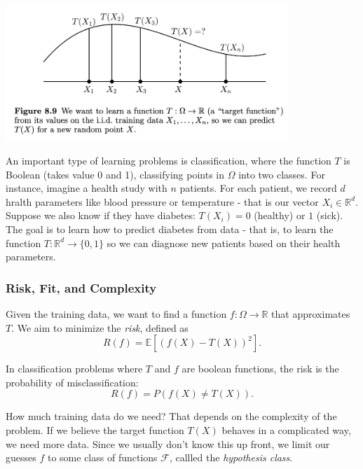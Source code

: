 \begin{center}
	\includegraphics[width=0.8\textwidth]{Chapter 8/fig8-9.png}
\end{center}

\begin{example}[Classification]
\label{ex:8.4.1}
An important type of learning problems is classification, where the function $T$ is Boolean (takes value 0 and 
1), classifying points in $\Omega$ into two classes. For instance, imagine a health study with $n$ patients. 
For each patient, we record $d$ hralth parameters like blood pressure or temperature - that is our vector 
$X_i \in \mathbb{R}^d$. Suppose we also know if they have diabetes: $T(X_i) = 0$ (healthy) or $1$ (sick). The 
goal is to learn how to predict diabetes from data - that is, to learn the function $T: \mathbb{R}^d \to 
\{ 0, 1 \}$ so we can diagnose new patients based on their health parameters.
\end{example}


\subsubsection{Risk, Fit, and Complexity}
Given the training data, we want to find a function $f: \Omega \to \mathbb{R}$ that approximates $T$. 
We aim to minimize the \textit{risk}, defined as
\[ R(f) = \mathbb{E}\left[ (f(X) - T(X))^2 \right]. \]

\begin{example}[]
\label{ex:8.4.2}
In classification problems where $T$ and $f$ are boolean functions, the risk is the probability of 
misclassification:
\[ R(f) = P(f(X) \neq T(X)). \]
\end{example}

How much training data do we need? That depends on the complexity of the problem. If we believe the target 
function $T(X)$ behaves in a complicated way, we need more data. Since we usually don't know this up front, we 
limit our guesses $f$ to some class of functions $\mathcal{F}$, callled the \textit{hypothesis class}.

